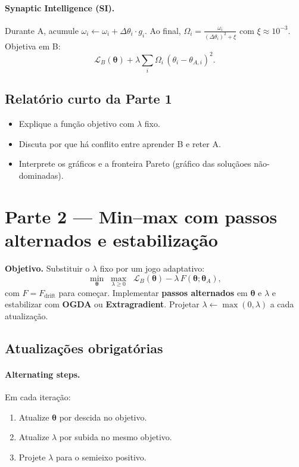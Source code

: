 \documentclass[9pt,a4paper]{extarticle}
\begin{document}
\paragraph{Synaptic Intelligence (SI).}
Durante A, acumule $\omega_i \leftarrow \omega_i + \Delta\theta_i \cdot g_i$.  
Ao final, $\Omega_i=\frac{\omega_i}{(\Delta\theta_i)^2+\xi}$ com $\xi\approx 10^{-3}$.  
Objetiva em B:
\[
\mathcal{L}_B(\bm{\theta}) + \lambda \sum_i \Omega_i\,(\theta_i-\theta_{A,i})^2.
\]

\subsection*{Relatório curto da Parte 1}
\begin{itemize}
  \item Explique a função objetivo com $\lambda$ fixo.
  \item Discuta por que há conflito entre aprender B e reter A.
  \item Interprete os gráficos e a fronteira Pareto (gráfico das soluçãoes não-dominadas).
\end{itemize}

\section*{Parte 2 — Min–max com passos alternados e estabilização}
\textbf{Objetivo.} Substituir o $\lambda$ fixo por um jogo adaptativo:
\[
\min_{\bm{\theta}}\;\max_{\lambda\ge 0}\;\; \mathcal{L}_B(\bm{\theta}) - \lambda\,F(\bm{\theta};\bm{\theta}_A),
\]
com $F = F_{\text{drift}}$ para começar. Implementar \textbf{passos alternados} em $\bm{\theta}$ e $\lambda$ e estabilizar com \textbf{OGDA} ou \textbf{Extragradient}. Projetar $\lambda \leftarrow \max(0,\lambda)$ a cada atualização.

\subsection*{Atualizações obrigatórias}
\paragraph{Alternating steps.}
Em cada iteração:
\begin{enumerate}
  \item Atualize $\bm{\theta}$ por descida no objetivo.
  \item Atualize $\lambda$ por subida no mesmo objetivo.
  \item Projete $\lambda$ para o semieixo positivo.
\end{enumerate}
\end{document}

